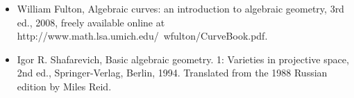 \documentclass[10pt]{article}
\begin{document}
\begin{itemize}

\item[] William Fulton, Algebraic curves: an introduction to algebraic geometry, 3rd ed., 2008, freely available online at http://www.math.lsa.umich.edu/~wfulton/CurveBook.pdf.\\
\item[] Igor R. Shafarevich, Basic algebraic geometry. 1: Varieties in projective space, 2nd ed., Springer-Verlag, Berlin, 1994. Translated from the 1988 Russian edition by Miles Reid.

\end{itemize}
\end{document}
